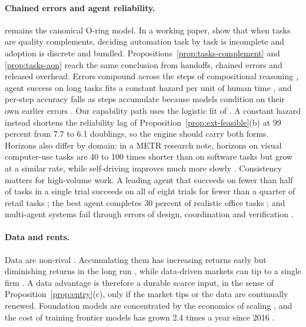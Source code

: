 \paragraph{Chained errors and agent reliability.} \citet{kremer1993oring} remains the canonical O-ring model. In a working paper, \citet{gans2026oring} show that when tasks are quality complements, deciding automation task by task is incomplete and adoption is discrete and bundled. Propositions~\ref{prop:tasks-complement} and \ref{prop:tasks-aon} reach the same conclusion from handoffs, chained errors and released overhead. Errors compound across the steps of compositional reasoning \citep{dziri2023faith}, agent success on long tasks fits a constant hazard per unit of human time \citep{ord2025is}, and per-step accuracy falls as steps accumulate because models condition on their own earlier errors \citep{sinha2025illusion}. Our capability path uses the logistic fit of \citet{kwa2025measuring}. A constant hazard instead shortens the reliability lag of Proposition~\ref{prop:ext-feasible}(b) at 99 percent from 7.7 to 6.1 doublings, so the engine should carry both forms. Horizons also differ by domain: in a METR research note, horizons on visual computer-use tasks are 40 to 100 times shorter than on software tasks but grow at a similar rate, while self-driving improves much more slowly \citep{kwa2025how}. Consistency matters for high-volume work. A leading agent that succeeds on fewer than half of tasks in a single trial succeeds on all of eight trials for fewer than a quarter of retail tasks \citep{yao2025tau}; the best agent completes 30 percent of realistic office tasks \citep{xu2024theagentcompany}; and multi-agent systems fail through errors of design, coordination and verification \citep{cemri2025why}.

\paragraph{Data and rents.} Data are non-rival \citep{jones2020nonrivalry}. Accumulating them has increasing returns early but diminishing returns in the long run \citep{farboodi2021model,farboodi2023data}, while data-driven markets can tip to a single firm \citep{prufer2021competing,hagiu2023data}. A data advantage is therefore a durable scarce input, in the sense of Proposition~\ref{prop:entry}(c), only if the market tips or the data are continually renewed. Foundation models are concentrated by the economics of scaling \citep{korinek2025concentrating}, and the cost of training frontier models has grown 2.4 times a year since 2016 \citep{cottier2024rising}.

